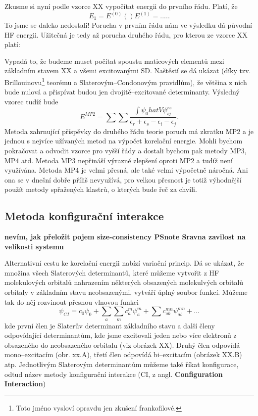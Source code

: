 Zkusme si nyní podle vzorce XX vypočítat energii do prvního řádu. Platí, že
\begin{equation}
E_1=E^{(0)}()E^{(1)}=.....
\end{equation}
To jsme se daleko nedostali! Porucha v prvním řádu nám ve výsledku dá původní HF energii.
Užitečná je tedy až porucha druhého řádu, pro kterou ze vzorce XX platí:

Vypadá to, že budeme muset počítat spoustu maticových elementů mezi základním stavem XX a všemi excitovanými SD. Naštěstí se dá ukázat (díky tzv. Brillouinovu\footnote{Toto jméno vysloví opravdu jen zkušení frankofilové.} teorému a Slaterovým--Condonovým pravidlům), že většina z nich bude nulová a přispívat budou jen dvojitě--excitované determinanty. Výsledný vzorec tudíž bude
\begin{equation}
E^{MP2}=\sum \sum \frac{\int \psi_0 hat{V} \psi_{ij}^{rs}}{\epsilon_r+\epsilon_s-\epsilon_i-\epsilon_j} .
\end{equation}
Metoda zahrnující příspěvky do druhého řádu teorie poruch má zkratku MP2 a je jednou s nejvíce užívaných metod na výpočet korelační energie. Mohli bychom pokračovat a odvodit vzorce pro vyšší řády a dostali bychom pak metody MP3, MP4 atd. 
Metoda MP3 nepřináší výrazné zlepšení oproti MP2 a tudíž není využívána. Metoda MP4 je velmi přesná, ale také velmi výpočetně náročná. Ani ona se v dnešní dobře příliš nevyužívá, pro velkou přesnost je totiž výhodnější použít metody spřažených klastrů, o kterých bude řeč za chvíli.


\subsection{Metoda konfigurační interakce}

\textbf{nevím, jak přeložit pojem size-consistency PSnote Sravna zavilost na velikosti systemu}

Alternativní cestu ke korelační energii nabízí variační princip. Dá se ukázat, že množina všech Slaterových determinantů, které můžeme vytvořit z HF molekulových orbitalů nahrazením některých obsazených molekulvých orbitalů orbitaly v základním stavu neobsazenými, vytváří úplný soubor funkcí. Můžeme tak do něj rozvinout přesnou vlnovou funkci 
\begin{equation}
\psi_{CI}=c_0\psi_0+\sum_a\sum_m c_a^m\psi_a^m+\sum c_{ab}^{mn}\psi_{ab}^{mn}+\dots
\label{rov:CIrozvoj}
\end{equation}
kde první člen je Slaterův determinant základního stavu a další členy odpovídající determinantům, kde jsme excitovali jeden nebo více elektronů z obsazeného do neobsazeného orbitalu (viz obrázek XX). Druhý člen odpovídá mono--excitacím (obr. xx.A), třetí člen odpovídá bi--excitacím (obrázek XX.B) atp. Jednotlivým Slaterovým determinantům můžeme také říkat konfigurace, odtud název metody konfigurační interakce (CI, z angl. \textbf{Configuration Interaction})

